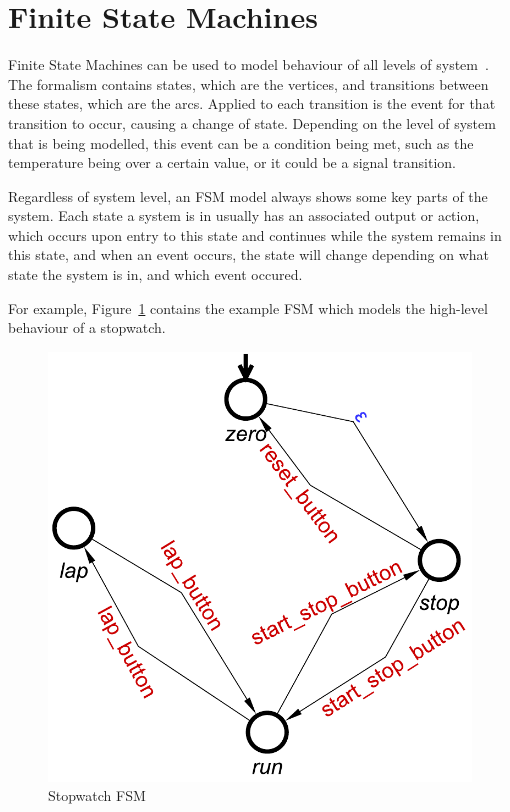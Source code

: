 \newpage
\section {Finite State Machines \label {sec:fsms}}

Finite State Machines can be used to model behaviour of all levels of system~\cite{Taraate2016}. 
The formalism contains states, which are the vertices, and transitions between these states, which 
are the arcs. Applied to each transition is the event for that transition to occur, causing a change 
of state. Depending on the level of system that is being modelled, this event can be a condition being met,
such as the temperature being over a certain value, or it could be a signal transition. 

Regardless of system level, an FSM model always shows some key parts of the system. Each state a system is 
in usually has an associated output or action, which occurs upon entry to this state and continues while the system remains
in this state, and when an event occurs, the state will change depending on what state the system is in, and which event occured. 

For example, Figure~\ref{fig:stopwatch} contains the example FSM which models the 
high-level behaviour of a stopwatch.

\begin{figure}[h]
\begin{centering}
\includegraphics[scale=0.5]{images/stopwatch-fsm}
\par\end{centering}
\protect\caption{\label{fig:stopwatch} Stopwatch FSM}
\end{figure}

